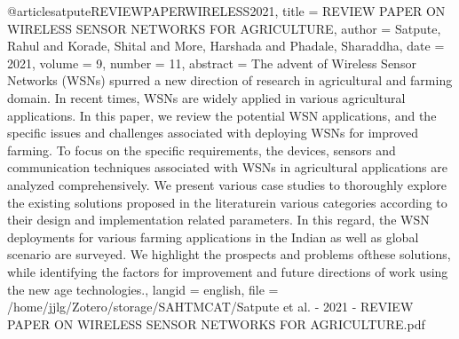 {{{{@article{satputeREVIEWPAPERWIRELESS2021,
  title = {{{REVIEW PAPER ON WIRELESS SENSOR NETWORKS FOR AGRICULTURE}}},
  author = {Satpute, Rahul and Korade, Shital and More, Harshada and Phadale, Sharaddha},
  date = {2021},
  volume = {9},
  number = {11},
  abstract = {The advent of Wireless Sensor Networks (WSNs) spurred a new direction of research in agricultural and farming domain. In recent times, WSNs are widely applied in various agricultural applications. In this paper, we review the potential WSN applications, and the specific issues and challenges associated with deploying WSNs for improved farming. To focus on the specific requirements, the devices, sensors and communication techniques associated with WSNs in agricultural applications are analyzed comprehensively. We present various case studies to thoroughly explore the existing solutions proposed in the literaturein various categories according to their design and implementation related parameters. In this regard, the WSN deployments for various farming applications in the Indian as well as global scenario are surveyed. We highlight the prospects and problems ofthese solutions, while identifying the factors for improvement and future directions of work using the new age technologies.},
  langid = {english},
  file = {/home/jjlg/Zotero/storage/SAHTMCAT/Satpute et al. - 2021 - REVIEW PAPER ON WIRELESS SENSOR NETWORKS FOR AGRICULTURE.pdf}
}

}}}}
